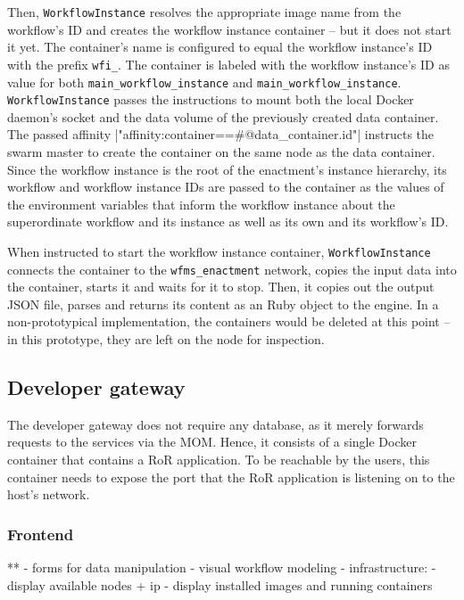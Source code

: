     Then, \texttt{WorkflowInstance} resolves the appropriate image name from the workflow's \ac{ID} and creates the workflow instance container -- but it does not start it yet. The container's name is configured to equal the workflow instance's \ac{ID} with the prefix \texttt{wfi\_}. The container is labeled with the workflow instance's \ac{ID} as value for both \texttt{main\_workflow\_instance} and \texttt{main\_workflow\_instance}. \texttt{WorkflowInstance} passes the instructions to mount both the local Docker daemon's socket and the data volume of the previously created data container. The passed affinity
    |"affinity:container==#{@data_container.id}"|
    instructs the swarm master to create the container on the same node as the data container. Since the workflow instance is the root of the enactment's instance hierarchy, its workflow and workflow instance \acp{ID} are passed to the container as the values of the environment variables that inform the workflow instance about the superordinate workflow and its instance as well as its own and its workflow's \ac{ID}.

    When instructed to start the workflow instance container, \texttt{WorkflowInstance} connects the container to the \texttt{wfms\_enactment} network, copies the input data into the container, starts it and waits for it to stop.
    Then, it copies out the output \ac{JSON} file, parses and returns its content as an Ruby object to the engine. In a non-prototypical implementation, the containers would be deleted at this point -- in this prototype, they are left on the node for inspection.

  \subsection{Developer gateway} %
    \label{sub:developer_gateway}
    The developer gateway does not require any database, as it merely forwards requests to the services via the \ac{MOM}. Hence, it consists of a single Docker container that contains a \ac{RoR} application. To be reachable by the users, this container needs to expose the port that the \ac{RoR} application is listening on to the host's network.


    \subsubsection{Frontend} %
      \label{ssub:frontend}
        ** - forms for data manipulation
        - visual workflow modeling
        - infrastructure:
          - display available nodes + ip
          - display installed images and running containers

